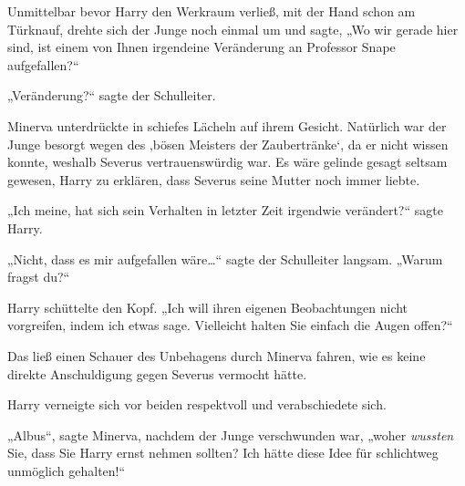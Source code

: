 Unmittelbar bevor Harry den Werkraum verließ, mit der Hand schon am Türknauf, drehte sich der Junge noch einmal um und sagte, „Wo wir gerade hier sind, ist einem von Ihnen irgendeine Veränderung an Professor Snape aufgefallen?“

„Veränderung?“ sagte der Schulleiter.

Minerva unterdrückte in schiefes Lächeln auf ihrem Gesicht. Natürlich war der Junge besorgt wegen des ‚bösen Meisters der Zaubertränke‘, da er nicht wissen konnte, weshalb Severus vertrauenswürdig war. Es wäre gelinde gesagt seltsam gewesen, Harry zu erklären, dass Severus seine Mutter noch immer liebte.

„Ich meine, hat sich sein Verhalten in letzter Zeit irgendwie verändert?“ sagte Harry.

„Nicht, dass es mir aufgefallen wäre…“ sagte der Schulleiter langsam. „Warum fragst du?“

Harry schüttelte den Kopf. „Ich will ihren eigenen Beobachtungen nicht vorgreifen, indem ich etwas sage. Vielleicht halten Sie einfach die Augen offen?“

Das ließ einen Schauer des Unbehagens durch Minerva fahren, wie es keine direkte Anschuldigung gegen Severus vermocht hätte.

Harry verneigte sich vor beiden respektvoll und verabschiedete sich.

\later

„Albus“, sagte Minerva, nachdem der Junge verschwunden war, „woher \emph{wussten} Sie, dass Sie Harry ernst nehmen sollten? Ich hätte diese Idee für schlichtweg unmöglich gehalten!“

